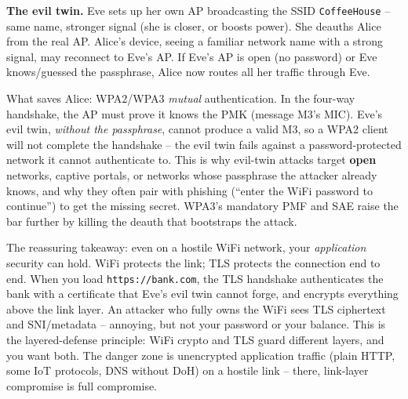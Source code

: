 \begin{attackbox}
\textbf{The evil twin.} Eve sets up her own AP broadcasting the SSID
\texttt{CoffeeHouse} -- same name, stronger signal (she is closer, or boosts
power). She deauths Alice from the real AP. Alice's device, seeing a familiar
network name with a strong signal, may reconnect to Eve's AP. If Eve's AP is open
(no password) or Eve knows/guessed the passphrase, Alice now routes all her
traffic through Eve.

What saves Alice: WPA2/WPA3 \emph{mutual} authentication. In the four-way
handshake, the AP must prove it knows the PMK (message M3's MIC). Eve's evil twin,
\emph{without the passphrase}, cannot produce a valid M3, so a WPA2 client will
not complete the handshake -- the evil twin fails against a password-protected
network it cannot authenticate to. This is why evil-twin attacks target
\textbf{open} networks, captive portals, or networks whose passphrase the attacker
already knows, and why they often pair with phishing (``enter the WiFi password to
continue'') to get the missing secret. WPA3's mandatory PMF and SAE raise the bar
further by killing the deauth that bootstraps the attack.
\end{attackbox}

\begin{intuitionbox}
The reassuring takeaway: even on a hostile WiFi network, your \emph{application}
security can hold. WiFi protects the link; TLS protects the connection end to end.
When you load \texttt{https://bank.com}, the TLS handshake authenticates the bank
with a certificate that Eve's evil twin cannot forge, and encrypts everything
above the link layer. An attacker who fully owns the WiFi sees TLS ciphertext and
SNI/metadata -- annoying, but not your password or your balance. This is the
layered-defense principle: WiFi crypto and TLS guard different layers, and you
want both. The danger zone is unencrypted application traffic (plain HTTP, some
IoT protocols, DNS without DoH) on a hostile link -- there, link-layer compromise
is full compromise.
\end{intuitionbox}

